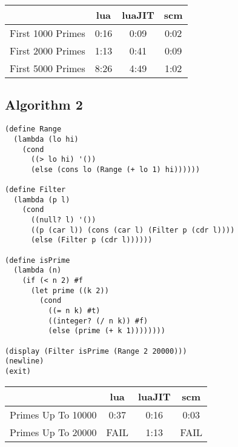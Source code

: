 \begin{center}
\begin{tabular}{|l|c|c|c|}
\hline
& lua & luaJIT & scm \\
\hline
First 1000 Primes & 0:16 & 0:09 & 0:02 \\ \hline
First 2000 Primes & 1:13 & 0:41 & 0:09 \\ \hline
First 5000 Primes & 8:26 & 4:49 & 1:02 \\ \hline
\end{tabular}
\end{center}

\subsection{Algorithm 2}

\begin{framed}
\begin{verbatim}
(define Range
  (lambda (lo hi)
    (cond
      ((> lo hi) '())
      (else (cons lo (Range (+ lo 1) hi))))))

(define Filter
  (lambda (p l)
    (cond
      ((null? l) '())
      ((p (car l)) (cons (car l) (Filter p (cdr l))))
      (else (Filter p (cdr l))))))

(define isPrime
  (lambda (n)
    (if (< n 2) #f
      (let prime ((k 2))
        (cond
          ((= n k) #t)
          ((integer? (/ n k)) #f)
          (else (prime (+ k 1))))))))

(display (Filter isPrime (Range 2 20000)))
(newline)
(exit)
\end{verbatim}
\end{framed}

\begin{center}
\begin{tabular}{|l|c|c|c|}
\hline
& lua & luaJIT & scm \\
\hline
Primes Up To 10000 & 0:37 & 0:16 & 0:03 \\ \hline
Primes Up To 20000 & FAIL & 1:13 & FAIL \\ \hline
\end{tabular}
\end{center}
